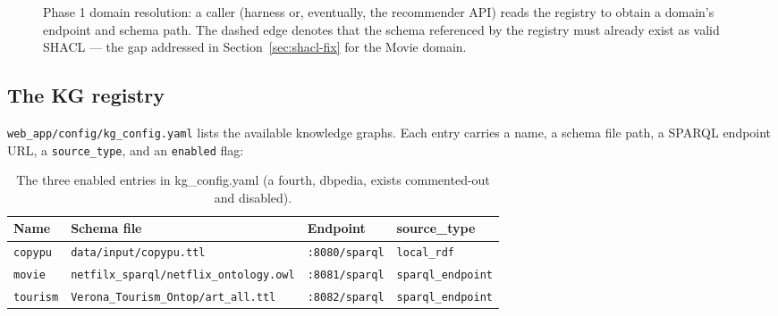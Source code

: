 \documentclass[11pt,a4paper]{article}
\newcommand{\code}[1]{\texttt{#1}}
\begin{document}
\begin{figure}[H]
\centering
\begin{adjustbox}{max width=0.8\textwidth, max totalheight=0.6\textheight, center}
\end{adjustbox}
\caption{Phase 1 domain resolution: a caller (harness or, eventually, the recommender API) reads
the registry to obtain a domain's endpoint and schema path. The dashed edge denotes that the
schema referenced by the registry must already exist as valid SHACL --- the gap addressed in
Section~\ref{sec:shacl-fix} for the Movie domain.}
\label{fig:phase1}
\end{figure}

\subsection{The KG registry}

\code{web\_app/config/kg\_config.yaml} lists the available knowledge graphs. Each entry carries a
name, a schema file path, a SPARQL endpoint URL, a \code{source\_type}, and an \code{enabled}
flag:

\begin{table}[H]
\centering
\begin{tabular}{lll l}
\toprule
\textbf{Name} & \textbf{Schema file} & \textbf{Endpoint} & \textbf{source\_type} \\
\midrule
\code{copypu}   & \code{data/input/copypu.ttl}            & \code{:8080/sparql} & \code{local\_rdf} \\
\code{movie}    & \code{netfilx\_sparql/netflix\_ontology.owl} & \code{:8081/sparql} & \code{sparql\_endpoint} \\
\code{tourism}  & \code{Verona\_Tourism\_Ontop/art\_all.ttl}  & \code{:8082/sparql} & \code{sparql\_endpoint} \\
\bottomrule
\end{tabular}
\caption{The three enabled entries in kg\_config.yaml (a fourth, dbpedia, exists commented-out
and disabled).}
\label{tab:kg-registry}
\end{table}
\end{document}
